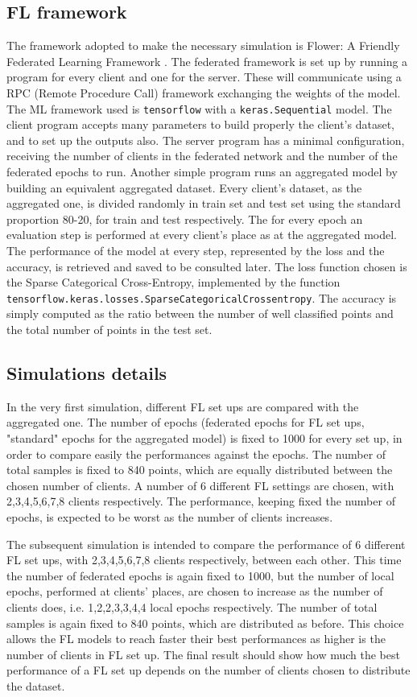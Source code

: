 \documentclass{article} %
\newcounter{points}
\newcounter{other}
\newcounter{late}
\begin{document}
\subsection{FL framework}
The framework adopted to make the necessary simulation is Flower: A Friendly Federated 
Learning Framework \cite{beutel2021flower}.
The federated framework is set up by running a program for every client and one for 
the server.
These will communicate using a RPC (Remote Procedure Call) framework exchanging the 
weights of the model.
The ML framework used is \verb|tensorflow| with a \verb|keras.Sequential| model.
The client program accepts many parameters to build properly the client's dataset, and 
to set up the outputs also.
The server program has a minimal configuration, receiving the number of clients in the 
federated network and the number of the federated epochs to run.
Another simple program runs an aggregated model by building an equivalent aggregated 
dataset.
Every client's dataset, as the aggregated one, is divided randomly in train set and test 
set using the standard proportion 80-20, for train and test respectively.
The for every epoch an evaluation step is performed at every client's place as at the 
aggregated model.
The performance of the model at every step, represented by the loss and the accuracy, 
is retrieved and saved to be consulted later.
The loss function chosen is the Sparse Categorical Cross-Entropy, implemented by the
function \verb|tensorflow.keras.losses.SparseCategoricalCrossentropy|.
The accuracy is simply computed as the ratio between the number of well classified points 
and the total number of points in the test set.

\subsection {Simulations details}
In the very first simulation, different FL set ups are compared with the aggregated one.
The number of epochs (federated epochs for FL set ups, "standard" epochs for the aggregated 
model) is fixed to 1000 for every set up, in order to compare easily the performances 
against the epochs.
The number of total samples is fixed to 840 points, which are equally distributed between the 
chosen number of clients.
A number of 6 different FL settings are chosen, with 2,3,4,5,6,7,8 clients respectively.
The performance, keeping fixed the number of epochs, is expected to be worst as the number 
of clients increases.

The subsequent simulation is intended to compare the performance of 6 different FL set ups, 
with 2,3,4,5,6,7,8 clients respectively, between each other.
This time the number of federated epochs is again fixed to 1000, but the number of local epochs,
performed at clients' places, are chosen to increase as the number of clients does, i.e. 1,2,2,3,3,4,4 
local epochs respectively.
The number of total samples is again fixed to 840 points, which are distributed as before.
This choice allows the FL models to reach faster their best performances as higher is the number of 
clients in FL set up.
The final result should show how much the best performance of a FL set up depends on the 
number of clients chosen to distribute the dataset.
\end{document}
